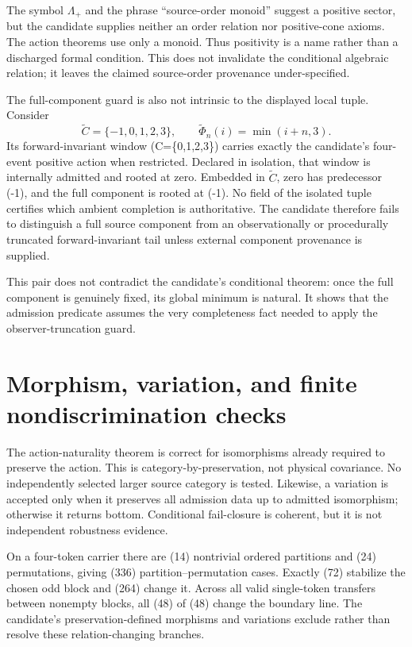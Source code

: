\documentclass[11pt]{article}
\begin{document}
The symbol \(\Lambda_+\) and the phrase ``source-order monoid'' suggest a
positive sector, but the candidate supplies neither an order relation nor
positive-cone axioms. The action theorems use only a monoid. Thus positivity
is a name rather than a discharged formal condition. This does not invalidate
the conditional algebraic relation; it leaves the claimed source-order
provenance under-specified.

The full-component guard is also not intrinsic to the displayed local tuple.
Consider
\[
 \widetilde C=\{-1,0,1,2,3\},\qquad
 \widetilde\Phi_n(i)=\min(i+n,3).
\]
Its forward-invariant window (C=\{0,1,2,3\}) carries exactly the candidate's
four-event positive action when restricted. Declared in isolation, that
window is internally admitted and rooted at zero. Embedded in
\(\widetilde C\), zero has predecessor (-1), and the full component is
rooted at (-1). No field of the isolated tuple certifies which ambient
completion is authoritative. The candidate therefore fails to distinguish a
full source component from an observationally or procedurally truncated
forward-invariant tail unless external component provenance is supplied.

This pair does not contradict the candidate's conditional theorem: once the
full component is genuinely fixed, its global minimum is natural. It shows
that the admission predicate assumes the very completeness fact needed to
apply the observer-truncation guard.

\section{Morphism, variation, and finite nondiscrimination checks}

The action-naturality theorem is correct for isomorphisms already required to
preserve the action. This is category-by-preservation, not physical covariance.
No independently selected larger source category is tested.
Likewise, a variation is accepted only when it preserves all admission data
up to admitted isomorphism; otherwise it returns bottom. Conditional
fail-closure is coherent, but it is not independent robustness evidence.

On a four-token carrier there are (14) nontrivial ordered partitions and
(24) permutations, giving (336) partition--permutation cases. Exactly
(72) stabilize the chosen odd block and (264) change it. Across all valid
single-token transfers between nonempty blocks, all (48) of (48) change
the boundary line. The candidate's preservation-defined morphisms and
variations exclude rather than resolve these relation-changing branches.
\end{document}
